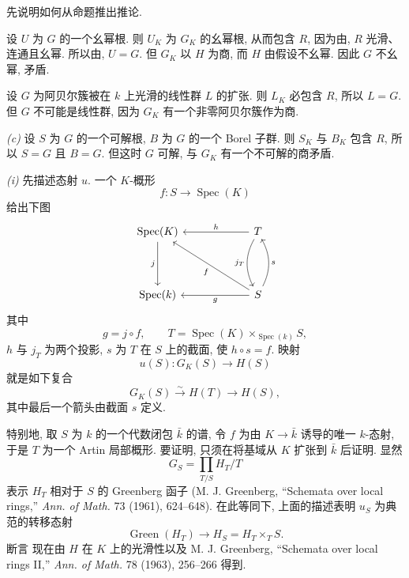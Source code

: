 先说明如何从命题推出推论.

\smallskip
\noindent\textit{} 设 \(U\) 为 \(G\) 的一个幺幂根.
则 \(U_K\) 为 \(G_K\) 的幺幂根,
从而包含 \(R\), 因为由,
\(R\) 光滑、连通且幺幂.
所以由, \(U=G\).
但 \(G_K\) 以 \(H\) 为商, 而 \(H\) 由假设不幺幂.
因此 \(G\) 不幺幂, 矛盾.

\smallskip
\noindent\textit{} 设 \(G\) 为阿贝尔簇被在 \(k\)
上光滑的线性群 \(L\) 的扩张.
则 \(L_K\) 必包含 \(R\), 所以 \(L=G\).
但 \(G\) 不可能是线性群, 因为 \(G_K\) 有一个非零阿贝尔簇作为商.

\smallskip
\noindent\textit{(c)} 设 \(S\) 为 \(G\) 的一个可解根,
\(B\) 为 \(G\) 的一个 Borel 子群.
则 \(S_K\) 与 \(B_K\) 包含 \(R\), 所以 \(S=G\) 且 \(B=G\).
但这时 \(G\) 可解, 与 \(G_K\) 有一个不可解的商矛盾.

\textit{(i)} 先描述态射 \(u\).
一个 \(K\)-概形
\[
  f:S\longrightarrow\operatorname{Spec}(K)
\]
给出下图
\[
\begin{tikzcd}[column sep=6.0em,row sep=4.0em]
  \operatorname{Spec}(K)
    \arrow[d,"j"'] &
  T
    \arrow[l,"h"']
    \arrow[d,bend right=28,"j_T"'] \\
  \operatorname{Spec}(k) &
  S
    \arrow[l,"g"]
    \arrow[ul,"f"]
    \arrow[u,bend right=28,"s"']
\end{tikzcd}
\]
其中
\[
  g=j\circ f,\qquad
  T=\operatorname{Spec}(K)\times_{\operatorname{Spec}(k)}S,
\]
\(h\) 与 \(j_T\) 为两个投影, \(s\) 为 \(T\) 在 \(S\) 上的截面,
使 \(h\circ s=f\). 映射
\[
  u(S):G_K(S)\longrightarrow H(S)
\]
就是如下复合
\[
  G_K(S)\xrightarrow{\sim}H(T)\longrightarrow H(S),
\]
其中最后一个箭头由截面 \(s\) 定义.

特别地, 取 \(S\) 为 \(k\) 的一个代数闭包 \(\bar k\) 的谱,
令 \(f\) 为由 \(K\to\bar k\) 诱导的唯一 \(k\)-态射,
于是 \(T\) 为一个 Artin 局部概形.
要证明,
只须在将基域从 \(K\) 扩张到 \(\bar k\) 后证明.
显然
\[
  G_S=\prod_{T/S}H_T/T
\]
表示 \(H_T\) 相对于 \(S\) 的 Greenberg 函子
(M. J. Greenberg, “Schemata over local rings,” \emph{Ann. of Math.} 73 (1961), 624--648).
在此等同下, 上面的描述表明 \(u_S\) 为典范的转移态射
\[
  \operatorname{Green}(H_T)\longrightarrow
  H_S=H_T\times_T S.
\]
断言
现在由 \(H\) 在 \(K\) 上的光滑性以及
M. J. Greenberg, “Schemata over local rings II,” \emph{Ann. of Math.} 78 (1963), 256--266 得到.

